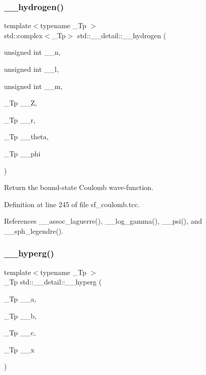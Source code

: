 \subsubsection{\texorpdfstring{\+\_\+\+\_\+hydrogen()}{\_\_hydrogen()}}
{\footnotesize\ttfamily template$<$typename \+\_\+\+Tp $>$ \\
std\+::complex$<$\+\_\+\+Tp$>$ std\+::\+\_\+\+\_\+detail\+::\+\_\+\+\_\+hydrogen (\begin{DoxyParamCaption}\item[{unsigned int}]{\+\_\+\+\_\+n,  }\item[{unsigned int}]{\+\_\+\+\_\+l,  }\item[{unsigned int}]{\+\_\+\+\_\+m,  }\item[{\+\_\+\+Tp}]{\+\_\+\+\_\+Z,  }\item[{\+\_\+\+Tp}]{\+\_\+\+\_\+r,  }\item[{\+\_\+\+Tp}]{\+\_\+\+\_\+theta,  }\item[{\+\_\+\+Tp}]{\+\_\+\+\_\+phi }\end{DoxyParamCaption})}

Return the bound-\/state Coulomb wave-\/function. 

Definition at line 245 of file sf\+\_\+coulomb.\+tcc.



References \+\_\+\+\_\+assoc\+\_\+laguerre(), \+\_\+\+\_\+log\+\_\+gamma(), \+\_\+\+\_\+psi(), and \+\_\+\+\_\+sph\+\_\+legendre().

\mbox{\label{namespacestd_1_1____detail_a316589a60d5e5f50201c2d42b980678c}} 
\subsubsection{\texorpdfstring{\+\_\+\+\_\+hyperg()}{\_\_hyperg()}}
{\footnotesize\ttfamily template$<$typename \+\_\+\+Tp $>$ \\
\+\_\+\+Tp std\+::\+\_\+\+\_\+detail\+::\+\_\+\+\_\+hyperg (\begin{DoxyParamCaption}\item[{\+\_\+\+Tp}]{\+\_\+\+\_\+a,  }\item[{\+\_\+\+Tp}]{\+\_\+\+\_\+b,  }\item[{\+\_\+\+Tp}]{\+\_\+\+\_\+c,  }\item[{\+\_\+\+Tp}]{\+\_\+\+\_\+x }\end{DoxyParamCaption})}



